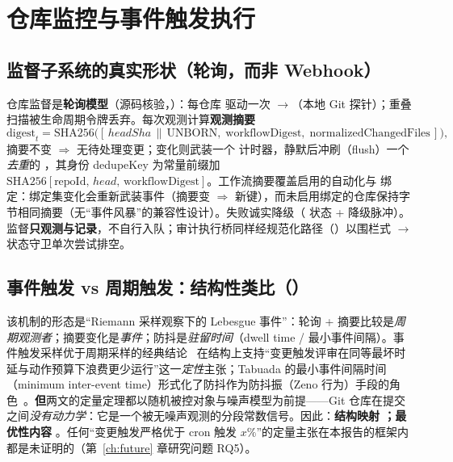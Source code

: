 \chapter{仓库监控与事件触发执行}\label{ch:monitoring}

\section{监督子系统的真实形状（轮询，而非 Webhook）}

仓库监督是\textbf{轮询模型}（源码核验，）：每仓库  驱动一次 $\to$（本地 Git 探针）；重叠扫描被生命周期令牌丢弃。每次观测计算\textbf{观测摘要}
\begin{equation}
\mathrm{digest}_t=\mathrm{SHA256}\bigl([\,headSha \,\|\, \text{UNBORN},\;\text{workflowDigest},\;\text{normalizedChangedFiles}\,]\bigr),
\end{equation}
摘要不变 $\Rightarrow$ 无待处理变更；变化则武装一个  计时器，静默后冲刷（flush）一个\emph{去重}的 ，其身份 dedupeKey 为常量前缀加 $\mathrm{SHA256}[\text{repoId},\,head,\,\text{workflowDigest}]$。工作流摘要覆盖启用的自动化与  绑定：绑定集变化会重新武装事件（摘要变 $\Rightarrow$ 新键），而未启用绑定的仓库保持字节相同摘要（无“事件风暴”的兼容性设计）。失败诚实降级（ 状态 + 降级脉冲）。监督\textbf{只观测与记录}，不自行入队；审计执行桥同样经规范化路径（）以围栏式 $\to$ 状态守卫单次尝试排空。

\section{事件触发 vs 周期触发：结构性类比（\STRONG）}

该机制的形态是“Riemann 采样观察下的 Lebesgue 事件”：轮询 + 摘要比较是\emph{周期观测者}；摘要变化是\emph{事件}；防抖是\emph{驻留时间}（dwell time / 最小事件间隔）。事件触发采样优于周期采样的经典结论~\cite{astrom1999} 在结构上支持“变更触发评审在同等最坏时延与动作预算下浪费更少运行”这一\emph{定性}主张；Tabuada 的最小事件间隔时间（minimum inter-event time）形式化了防抖作为防抖振（Zeno 行为）手段的角色~\cite{tabuada2007}。\textbf{但}两文的定量定理都以随机被控对象与噪声模型为前提——Git 仓库在提交之间\emph{没有动力学}：它是一个被无噪声观测的分段常数信号。因此：\textbf{结构映射 \STRONG；最优性内容 \WEAK}。任何“变更触发严格优于 cron 触发 $x\%$”的定量主张在本报告的框架内都是未证明的（第~\ref{ch:future} 章研究问题 RQ5）。

